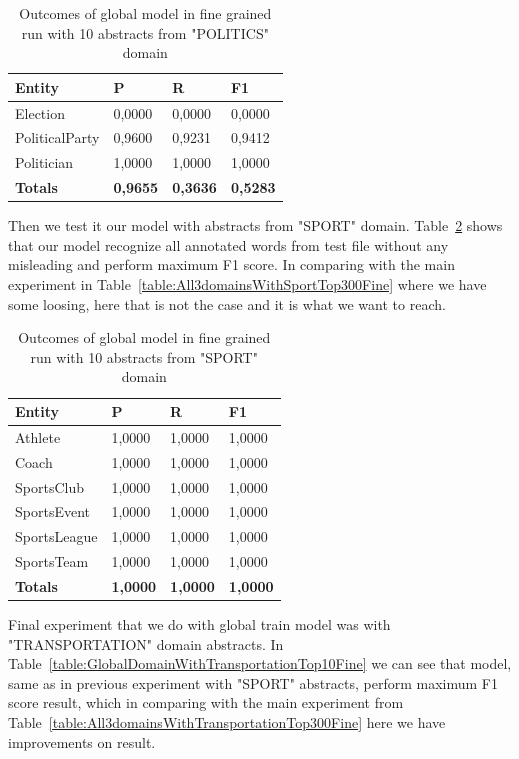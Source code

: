 \documentclass[thesis=M,english]{FITthesis}[2018/05/30]
\begin{document}
	\begin{table}[H]\centering
		\begin{tabular}{|l|l|l|l|}
			\hline {\textbf{Entity}} & {\textbf{P}} & {\textbf{R}} & {\textbf{F1}}\\\hline
				Election & 0,0000 & 0,0000 & 0,0000\\
				PoliticalParty & 0,9600 & 0,9231 & 0,9412\\
				Politician & 1,0000 & 1,0000 & 1,0000\\\hline
				\textbf{Totals} & \textbf{0,9655} & \textbf{0,3636} & \textbf{0,5283}\\\hline
		\end{tabular}
		\caption{Outcomes of global model in fine grained run with 10 abstracts from "POLITICS" domain \label{table:GlobalDomainWithPoliticsTop10Fine}}		
	\end{table}	

	Then we test it our model with abstracts from "SPORT" domain. Table~\ref{table:GlobalDomainWithSportTop10Fine} shows that our model recognize all annotated words from test file without any misleading and perform maximum F1 score. In comparing with the main experiment in Table~\ref{table:All3domainsWithSportTop300Fine} where we have some loosing, here that is not the case and it is what we want to reach.
	
	\begin{table}[H]\centering
		\begin{tabular}{|l|l|l|l|}
			\hline {\textbf{Entity}} & {\textbf{P}} & {\textbf{R}} & {\textbf{F1}}\\\hline
				Athlete & 1,0000 & 1,0000 & 1,0000\\
				Coach & 1,0000 & 1,0000 & 1,0000\\
				SportsClub & 1,0000 & 1,0000 & 1,0000\\
				SportsEvent & 1,0000 & 1,0000 & 1,0000\\
				SportsLeague & 1,0000 & 1,0000 & 1,0000\\
				SportsTeam & 1,0000 & 1,0000 & 1,0000\\\hline
				\textbf{Totals} & \textbf{1,0000} & \textbf{1,0000} & \textbf{1,0000}\\\hline
		\end{tabular}
		\caption{Outcomes of global model in fine grained run with 10 abstracts from "SPORT" domain \label{table:GlobalDomainWithSportTop10Fine}}		
	\end{table}
	
	Final experiment that we do with global train model was with "TRANSPORTATION" domain abstracts. In Table~\ref{table:GlobalDomainWithTransportationTop10Fine} we can see that model, same as in previous experiment with "SPORT" abstracts, perform maximum F1 score result, which in comparing with the main experiment from Table~\ref{table:All3domainsWithTransportationTop300Fine} here we have improvements on result.
	 
\end{document}
